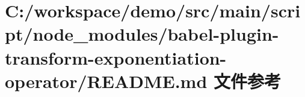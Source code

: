 \hypertarget{node__modules_2babel-plugin-transform-exponentiation-operator_2_r_e_a_d_m_e_8md}{}\section{C\+:/workspace/demo/src/main/script/node\+\_\+modules/babel-\/plugin-\/transform-\/exponentiation-\/operator/\+R\+E\+A\+D\+ME.md 文件参考}
\label{node__modules_2babel-plugin-transform-exponentiation-operator_2_r_e_a_d_m_e_8md}
